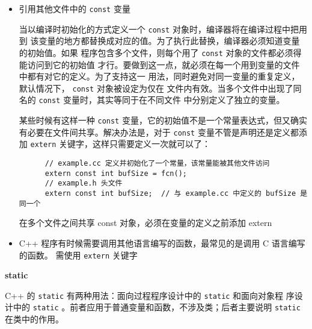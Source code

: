 \begin{itemize}
\item 引用其他文件中的 \verb|const| 变量

  当以编译时初始化的方式定义一个 \verb|const| 对象时，编译器将在编译过程中把用到
  该变量的地方都替换成对应的值。为了执行此替换，编译器必须知道变量的初始值。如果
  程序包含多个文件，则每个用了 \verb|const| 对象的文件都必须得能访问到它的初始值
  才行。要做到这一点，就必须在每一个用到变量的文件中都有对它的定义。为了支持这一
  用法，同时避免对同一变量的重复定义，默认情况下， \verb|const| 对象被设定为仅在
  文件内有效。当多个文件中出现了同名的 \verb|const| 变量时，其实等同于在不同文件
  中分别定义了独立的变量。

  某些时候有这样一种 \verb|const| 变量，它的初始值不是一个常量表达式，但又确实
  有必要在文件间共享。解决办法是，对于 \verb|const| 变量不管是声明还是定义都添加
  \verb|extern| 关键字，这样只需要定义一次就可以了：

  \begin{sourcecode}[hbtp]
    \begin{Verbatim}
      // example.cc 定义并初始化了一个常量，该常量能被其他文件访问
      extern const int bufSize = fcn();
      // example.h 头文件
      extern const int bufSize;  // 与 example.cc 中定义的 bufSize 是同一个
    \end{Verbatim}
    \caption{在多个文件之间共享 const 对象，必须在变量的定义之前添加 extern}
  \end{sourcecode}

\item C++ 程序有时候需要调用其他语言编写的函数，最常见的是调用 C 语言编写的函数。
  需使用 \verb|extern| 关键字
\end{itemize}

\noindent\textbf{static}

C++ 的 \verb|static| 有两种用法：面向过程程序设计中的 \verb|static| 和面向对象程
序设计中的 \verb|static| 。前者应用于普通变量和函数，不涉及类；后者主要说明
\verb|static| 在类中的作用。

